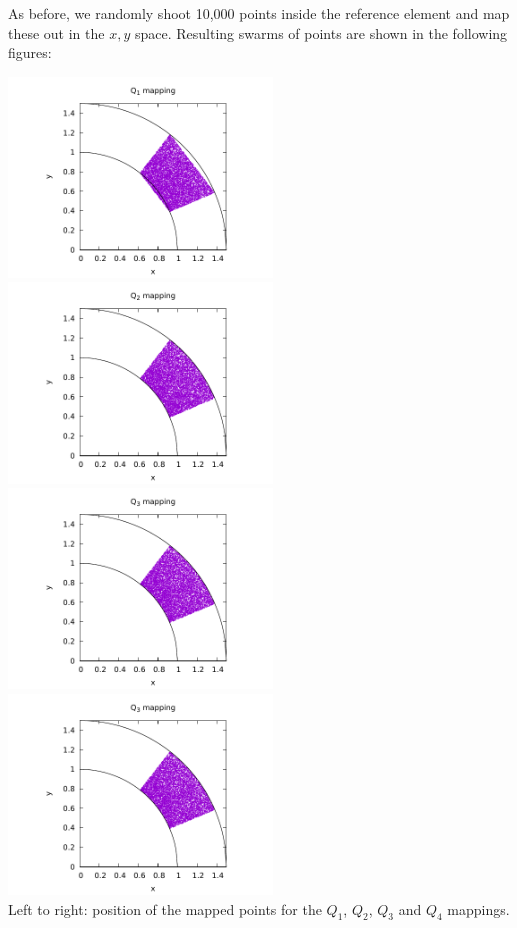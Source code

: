 As before, we randomly shoot 10,000 points inside the reference element 
and map these out in the $x,y$ space. Resulting swarms of points are shown 
in the following figures:

\begin{center}
\includegraphics[width=7cm]{images/mappings/curved/xy1_volume.pdf}
\includegraphics[width=7cm]{images/mappings/curved/xy2_volume.pdf}\\
\includegraphics[width=7cm]{images/mappings/curved/xy3_volume.pdf}
\includegraphics[width=7cm]{images/mappings/curved/xy3_volume.pdf}\\
{\captionfont Left to right: position of the mapped points for the $Q_1$, $Q_2$, $Q_3$ 
and $Q_4$ mappings.}
\end{center}


